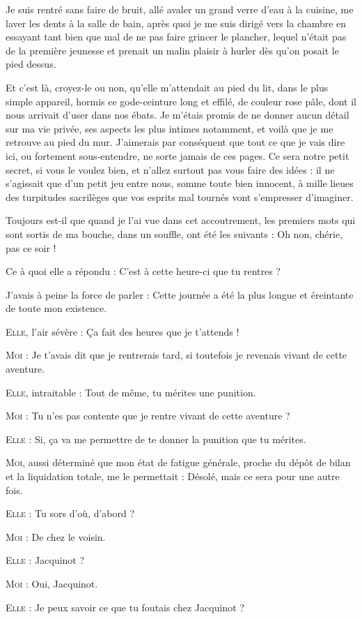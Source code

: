 Je suis rentré sans faire de bruit, allé avaler un grand verre d’eau à la cuisine, me laver les dents à la salle de bain, après quoi je me suis dirigé vers la chambre en essayant tant bien que mal de ne pas faire grincer le plancher, lequel n’était pas de la première jeunesse et prenait un malin plaisir à hurler dès qu’on posait le pied dessus.

Et c’est là, croyez-le ou non, qu’elle m’attendait au pied du lit, dans le plus simple appareil, hormis ce gode-ceinture long et effilé, de couleur rose pâle, dont il nous arrivait d’user dans nos ébats. Je m’étais promis de ne donner aucun détail sur ma vie privée, ses aspects les plus intimes notamment, et voilà que je me retrouve au pied du mur. J’aimerais par conséquent que tout ce que je vais dire ici, ou fortement sous-entendre, ne sorte jamais de ces pages. Ce sera notre petit secret, si vous le voulez bien, et n’allez surtout pas vous faire des idées : il ne s’agissait que d’un petit jeu entre nous, somme toute bien innocent, à mille lieues des turpitudes sacrilèges que vos esprits mal tournés vont s’empresser d’imaginer.

\begin{dialogue}
    
Toujours est-il que quand je l’ai vue dans cet accoutrement, les premiers mots qui sont sortis de ma bouche, dans un souffle, ont été les suivants : Oh non, chérie, pas ce soir !

Ce à quoi elle a répondu : C’est à cette heure-ci que tu rentres ?

J’avais à peine la force de parler : Cette journée a été la plus longue et éreintante de toute mon existence.

\textsc{Elle}, l’air sévère : Ça fait des heures que je t’attends !

\textsc{Moi} : Je t’avais dit que je rentrerais tard, si toutefois je revenais vivant de cette aventure.

\textsc{Elle}, intraitable : Tout de même, tu mérites une punition.

\textsc{Moi} : Tu n’es pas contente que je rentre vivant de cette aventure ?

\textsc{Elle} : Si, ça va me permettre de te donner la punition que tu mérites.

\textsc{Moi}, aussi déterminé que mon état de fatigue générale, proche du dépôt de bilan et la liquidation totale, me le permettait : Désolé, mais ce sera pour une autre fois.

\textsc{Elle} : Tu sors d’où, d’abord ?

\textsc{Moi} : De chez le voisin.

\textsc{Elle} : Jacquinot ?

\textsc{Moi} : Oui, Jacquinot.

\textsc{Elle} : Je peux savoir ce que tu foutais chez Jacquinot ?

\end{dialogue}
    
